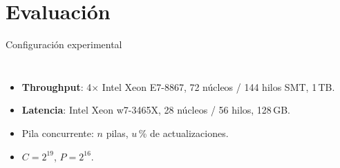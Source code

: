 \documentclass[aspectratio=169,11pt,xcolor=table]{beamer}
\begin{document}
\section{Evaluación}
\begin{frame}{Configuración experimental}
  \begin{columns}[c]
    \begin{itemize}
      \item<1-> \textbf{Throughput}: 4$\times$ Intel Xeon E7-8867, 72 núcleos / \alert{144 hilos SMT}, 1\,TB.
      \item<2-> \textbf{Latencia}: Intel Xeon w7-3465X, 28 núcleos / \alert{56 hilos}, 128\,GB.
      \item<3-> Pila concurrente: $n$ pilas, $u$\,\% de actualizaciones.
      \item<4-> $C = 2^{19}$, $P = 2^{16}$.
    \end{itemize}
  \end{columns}
\end{frame}
\end{document}

